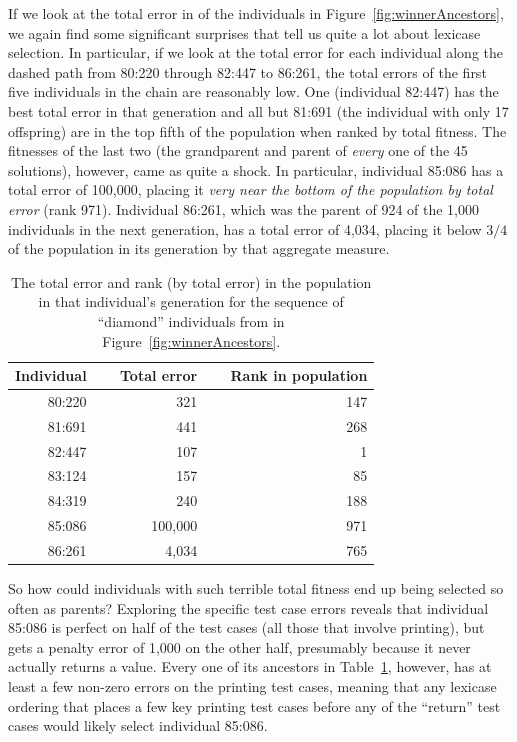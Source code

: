 If we look at the total error in of the individuals in Figure~\ref{fig:winnerAncestors}, we again
find some significant surprises that tell us quite a lot about lexicase selection. In particular, if
we look at the total error for each individual along the dashed path from 80:220 through
82:447 to 86:261, the total errors of the first five
individuals in the chain are reasonably low. One (individual 82:447) has the best total error in
that generation and all but 81:691 (the individual with only 17 offspring) are in the top fifth of the 
population when ranked by total fitness. The fitnesses 
of the last two (the grandparent and parent of \emph{every} one of the 45 solutions), however, 
came as quite a shock. In particular, individual 85:086 has a total error of 100,000, placing it
\emph{very near the bottom of the population by total error} (rank 971). Individual 86:261, which was
the parent of 924 of the 1,000 individuals in the next generation, has a total error of 4,034, placing
it below $3/4$ of the population in its generation by that aggregate measure.

\begin{table}[t]
	\caption{The total error and rank (by total error) in the population in that individual's generation
		for the sequence of ``diamond'' individuals from in Figure~\ref{fig:winnerAncestors}.}
	\label{table:winnerFitnesses}
	\begin{center}
	\begin{tabular}{rrr}
		Individual & $\quad$ Total error & $\quad$ Rank in population \\
		\hline\noalign{\smallskip}
		80:220 & 321 & 147 \\
		81:691 & 441 & 268 \\
		82:447 & 107 & 1 \\
		83:124 & 157 & 85 \\
		84:319 & 240 & 188 \\
		85:086 & 100,000 & 971 \\
		86:261 & 4,034 & 765
	\end{tabular}
	\end{center}
\end{table}

So how could individuals with such terrible total fitness end up being selected so often as parents?
Exploring the specific test case errors reveals that individual 85:086 is perfect on half of the test
cases (all those that involve printing), but gets a penalty error of 1,000 on the other half, presumably
because it never actually returns a value. Every one of its ancestors in 
Table~\ref{table:winnerFitnesses}, however, has at least a few non-zero errors on the printing
test cases, meaning that any lexicase ordering that places a few key printing test cases before
any of the ``return'' test cases would likely select individual 85:086.

